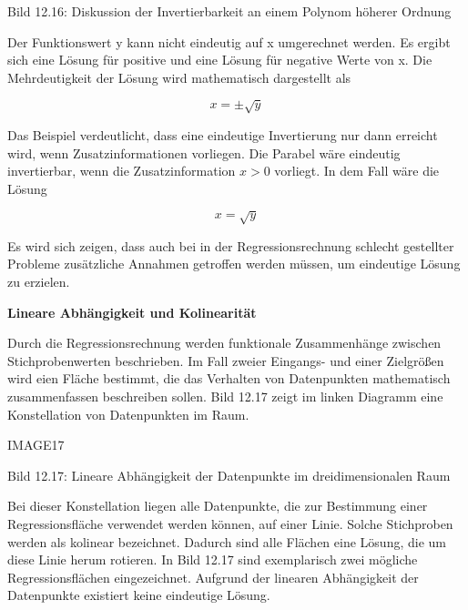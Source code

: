 \noindent Bild 12.16: Diskussion der Invertierbarkeit an einem Polynom h\"{o}herer Ordnung

\noindent Der Funktionswert y kann nicht eindeutig auf x umgerechnet werden. Es ergibt sich eine L\"{o}sung f\"{u}r positive und eine L\"{o}sung f\"{u}r negative Werte von x. Die Mehrdeutigkeit der L\"{o}sung wird mathematisch dargestellt als 

\begin{equation}\label{eq:thirteenninetyfour}
x=\pm \sqrt{y}
\end{equation}

\noindent Das Beispiel verdeutlicht, dass eine eindeutige Invertierung nur dann erreicht wird, wenn Zusatzinformationen vorliegen. Die Parabel w\"{a}re eindeutig invertierbar, wenn die Zusatzinformation $x > 0$ vorliegt. In dem Fall w\"{a}re die L\"{o}sung 

\begin{equation}\label{eq:thirteenninetyfive}
x= \sqrt{y}
\end{equation}

\noindent Es wird sich zeigen, dass auch bei in der Regressionsrechnung schlecht gestellter Probleme zus\"{a}tzliche Annahmen getroffen werden m\"{u}ssen, um eindeutige L\"{o}sung zu erzielen. \bigskip

\selectfont
\noindent\textbf{{Lineare Abh\"{a}ngigkeit und Kolinearit\"{a}t}} \smallskip

\noindent Durch die Regressionsrechnung werden funktionale Zusammenh\"{a}nge zwischen Stichprobenwerten beschrieben. Im Fall zweier Eingangs- und einer Zielgr\"{o}{\ss}en wird eien Fl\"{a}che bestimmt, die das Verhalten von Datenpunkten mathematisch zusammenfassen beschreiben sollen. Bild 12.17 zeigt im linken Diagramm eine Konstellation von Datenpunkten im Raum. 

IMAGE17

\noindent Bild 12.17: Lineare Abh\"{a}ngigkeit der Datenpunkte im dreidimensionalen Raum

\noindent Bei dieser Konstellation liegen alle Datenpunkte, die zur Bestimmung einer Regressionsfl\"{a}che verwendet werden k\"{o}nnen, auf einer Linie. Solche Stichproben werden als kolinear bezeichnet. Dadurch sind alle Fl\"{a}chen eine L\"{o}sung, die um diese Linie herum rotieren. In Bild 12.17 sind exemplarisch zwei m\"{o}gliche Regressionsfl\"{a}chen eingezeichnet. Aufgrund der linearen Abh\"{a}ngigkeit der Datenpunkte existiert keine eindeutige L\"{o}sung.\newline

